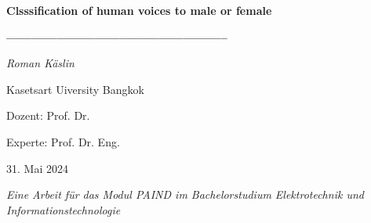 \begin{titlepage}
    \centering
    
    {\Huge\bfseries Clsssification of human voices to male or female \par}
    \vspace{1.5cm}
    
    {\Large\bfseries ----------------------------------------------------- \par}
    \vspace{1.5cm}
    
    {\large\textit{Roman Käslin}\par}
    \vspace{0.5cm}
    
    {\large Kasetsart Uiversity Bangkok\par}
    \vspace{1cm}

    {\large Dozent: Prof. Dr. \par}
    {\large Experte: Prof. Dr. Eng. \par}
    \vspace{1.5cm}
    

    {\large 31. Mai 2024\par}
    \vfill
    
    {\large \textit{Eine Arbeit für das Modul PAIND im Bachelorstudium Elektrotechnik und Informationstechnologie}\par}
\end{titlepage}
